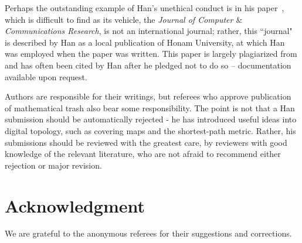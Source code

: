 \documentclass{article} \UseRawInputEncoding
\theoremstyle{plain}
\theoremstyle{definition}
\numberwithin{thm}{section}
\begin{document}
Perhaps the outstanding example of Han's unethical conduct is in his
paper~\cite{plagiarized}, which is difficult to find
as its vehicle, the {\em Journal of Computer $\&$ Communications Research},
is not an international journal; rather, this ``journal" is described by
Han as a local publication of
Honam University, at which Han was employed when the paper was written. This
paper is largely plagiarized from \cite{Boxer94,Boxer99} and has often been cited
by Han after he pledged not to do so -- documentation available
upon request.

Authors are responsible for their writings, but referees who approve publication
of mathematical trash also bear some responsibility. The point is not that a
Han submission should be automatically rejected - he 
has introduced useful ideas into digital topology,
such as covering maps and the 
shortest-path metric. Rather, his submissions should 
be reviewed with the greatest
care, by reviewers with good knowledge of the relevant literature, who are not afraid
to recommend either rejection or major revision.

\section{Acknowledgment}
We are grateful to the anonymous referees for their
suggestions and corrections.
\end{document}

